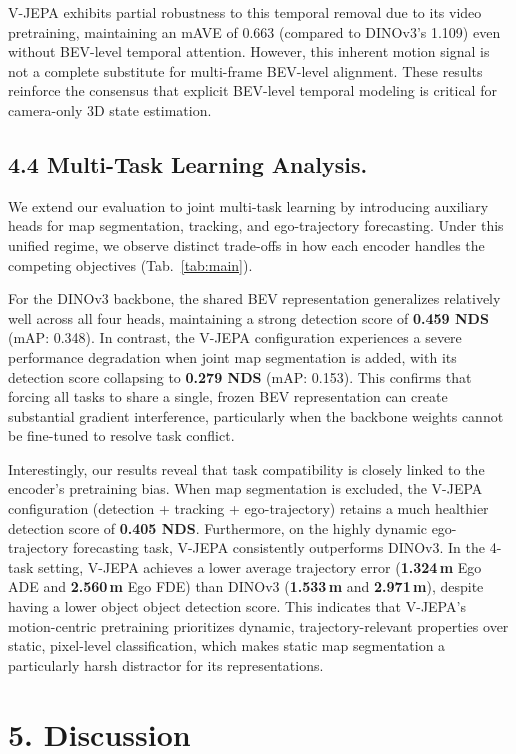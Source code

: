 \documentclass[12pt]{article}
\begin{document}
V-JEPA exhibits partial robustness to this temporal removal due to its video pretraining, maintaining an mAVE of 0.663 (compared to DINOv3's 1.109) even without BEV-level temporal attention. However, this inherent motion signal is not a complete substitute for multi-frame BEV-level alignment. These results reinforce the consensus that explicit BEV-level temporal modeling is critical for camera-only 3D state estimation.

\subsection{4.4 Multi-Task Learning Analysis.}
We extend our evaluation to joint multi-task learning by introducing auxiliary heads for map segmentation, tracking, and ego-trajectory forecasting. Under this unified regime, we observe distinct trade-offs in how each encoder handles the competing objectives (Tab.~\ref{tab:main}).

For the DINOv3 backbone, the shared BEV representation generalizes relatively well across all four heads, maintaining a strong detection score of \textbf{0.459 NDS} (mAP: 0.348). In contrast, the V-JEPA configuration experiences a severe performance degradation when joint map segmentation is added, with its detection score collapsing to \textbf{0.279 NDS} (mAP: 0.153). This confirms that forcing all tasks to share a single, frozen BEV representation can create substantial gradient interference, particularly when the backbone weights cannot be fine-tuned to resolve task conflict.

Interestingly, our results reveal that task compatibility is closely linked to the encoder's pretraining bias. When map segmentation is excluded, the V-JEPA configuration (detection + tracking + ego-trajectory) retains a much healthier detection score of \textbf{0.405 NDS}. Furthermore, on the highly dynamic ego-trajectory forecasting task, V-JEPA consistently outperforms DINOv3. In the 4-task setting, V-JEPA achieves a lower average trajectory error (\textbf{1.324\,m} Ego ADE and \textbf{2.560\,m} Ego FDE) than DINOv3 (\textbf{1.533\,m} and \textbf{2.971\,m}), despite having a lower object object detection score. This indicates that V-JEPA's motion-centric pretraining prioritizes dynamic, trajectory-relevant properties over static, pixel-level classification, which makes static map segmentation a particularly harsh distractor for its representations.

\section{5. Discussion}
\end{document}
